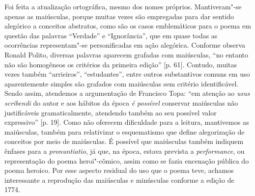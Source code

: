 Foi feita a atualização ortográfica, mesmo dos nomes próprios. Mantiveram"-se
apenas as maiúsculas, porque muitas vezes são empregadas para dar sentido
alegórico a conceitos abstratos, como são os casos emblemáticos para o poema
em questão das palavras ``Verdade'' e ``Ignorância'', que em quase todas as
ocorrências representam"-se personificadas em ação alegórica.
Conforme observa Ronald Polito, diversas palavras aparecem grafadas com maiúsculas,
``no entanto não são homogêneos os critérios da primeira edição'' [p. 61].
Contudo, muitas vezes também ``arrieiros'', ``estudantes'', entre outros substantivos
comuns em uso aparentemente simples são grafados com maiúsculas sem critério identificável.
Sendo assim, atendemos a argumentação de Francisco Topa: ``em atenção ao \textit{usus
scribendi} do autor e aos hábitos da época \textit{é possível} conservar maiúsculas
não justificáveis gramaticalmente, atendendo também ao seu possível valor expressivo'' [p. 19].
Como não oferecem dificuldade para a leitura, mantivemos as maiúsculas,
também para relativizar o esquematismo que define alegorização de conceitos por
meio de maiúsculas. É possível que maiúsculas também indiquem ênfases para a
\textit{pronuntiatio}, já que, na época, estava prevista a \textit{performance},
ou representação do poema heroi"-cômico, assim como se fazia encenação pública do
poema heroico. Por esse aspecto residual do uso que o poema teve, achamos interessante
a reprodução das maiúsculas e minúsculas conforme a edição de 1774. %

